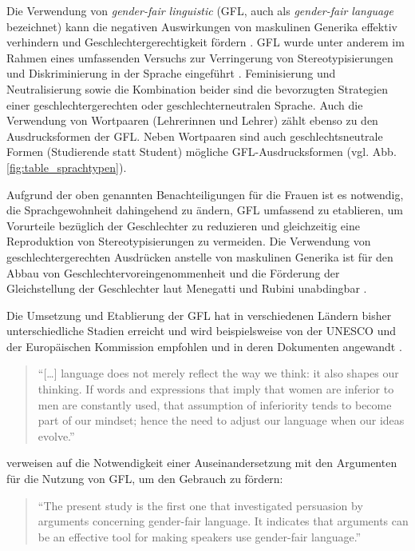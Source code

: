 \documentclass[12pt, 
    twoside=false, 
    bibliography=totoc, 
    numbers=endperiod, 
    headings=normal, 
    toc=chapterentrydotfill
    ]{scrbook}
\begin{document}
Die Verwendung von \emph{gender-fair linguistic} (GFL, auch als \emph{gender-fair language} bezeichnet) kann die negativen Auswirkungen von maskulinen Generika effektiv verhindern und Geschlechtergerechtigkeit fördern \parencite[1]{menegatti_2017}.
GFL wurde unter anderem im Rahmen eines umfassenden Versuchs zur Verringerung von Stereotypisierungen und Diskriminierung in der Sprache eingeführt \parencite[2]{sczesny_2016}.  Feminisierung und Neutralisierung sowie die Kombination beider sind die bevorzugten Strategien einer geschlechtergerechten oder geschlechterneutralen Sprache. Auch die Verwendung von Wortpaaren (Lehrerinnen und Lehrer) zählt ebenso zu den Ausdrucksformen der GFL. Neben Wortpaaren sind auch geschlechtsneutrale Formen (Studierende statt Student) mögliche GFL-Ausdrucksformen (vgl. Abb. \ref{fig:table_sprachtypen})\parencite[2]{sczesny_2016}.


Aufgrund der oben genannten Benachteiligungen für die Frauen ist es notwendig, die Sprachgewohnheit dahingehend zu ändern, GFL umfassend zu etablieren, um Vorurteile bezüglich der Geschlechter zu reduzieren und gleichzeitig eine Reproduktion von Stereotypisierungen zu vermeiden. Die Verwendung von geschlechtergerechten Ausdrücken anstelle von maskulinen Generika ist für den Abbau von Geschlechtervoreingenommenheit und die Förderung der Gleichstellung der Geschlechter laut Menegatti und Rubini unabdingbar \parencite*{menegatti_2017}.

Die Umsetzung und Etablierung der GFL hat in verschiedenen Ländern bisher unterschiedliche Stadien erreicht und wird beispielsweise von der UNESCO und der Europäischen Kommission empfohlen und in deren Dokumenten angewandt \parencite[4]{sczesny_2016}.

\citereset
\begin{quote}
    \enquote{[…] language does not merely reflect the way we think: it also shapes our thinking. If words and expressions that imply that women are inferior to men are constantly used, that assumption of inferiority tends to become part of our mindset; hence the need to adjust our language when our ideas evolve.} \parencite {unesco_2011}
\end{quote}

\textcite{koeser_2014} verweisen auf die Notwendigkeit einer Auseinandersetzung mit den Argumenten für die Nutzung von GFL, um den Gebrauch zu fördern:
\begin{quote}
    \enquote {The present study is the first one that investigated persuasion by arguments concerning gender-fair language. It indicates that arguments can be an effective tool for making speakers use gender-fair language.} \parencite[556]{koeser_2014}
\end{quote} 
\end{document}
